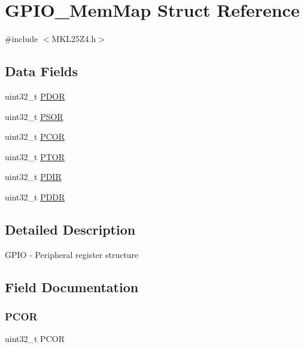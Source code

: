 \hypertarget{struct_g_p_i_o___mem_map}{}\section{G\+P\+I\+O\+\_\+\+Mem\+Map Struct Reference}
\label{struct_g_p_i_o___mem_map}


{\ttfamily \#include $<$M\+K\+L25\+Z4.\+h$>$}

\subsection*{Data Fields}
\begin{DoxyCompactItemize}
\item 
uint32\+\_\+t \hyperlink{struct_g_p_i_o___mem_map_a6d8857d2ca1928bcedd1a83e93946aef}{P\+D\+OR}
\item 
uint32\+\_\+t \hyperlink{struct_g_p_i_o___mem_map_a2fc5ff57bdc9e1de4233930468cbf5e3}{P\+S\+OR}
\item 
uint32\+\_\+t \hyperlink{struct_g_p_i_o___mem_map_adba03f40e10aed5fc14d7ee0698aa6f2}{P\+C\+OR}
\item 
uint32\+\_\+t \hyperlink{struct_g_p_i_o___mem_map_a2a8b6ad3b774b37fcdf9a0f04f56e43b}{P\+T\+OR}
\item 
uint32\+\_\+t \hyperlink{struct_g_p_i_o___mem_map_a4c83a78320344c89b1663969a7c5d749}{P\+D\+IR}
\item 
uint32\+\_\+t \hyperlink{struct_g_p_i_o___mem_map_a37eee18eef001998403709bf78f4a33d}{P\+D\+DR}
\end{DoxyCompactItemize}


\subsection{Detailed Description}
G\+P\+IO -\/ Peripheral register structure 

\subsection{Field Documentation}
\mbox{\label{struct_g_p_i_o___mem_map_adba03f40e10aed5fc14d7ee0698aa6f2}} 
\subsubsection{\texorpdfstring{P\+C\+OR}{PCOR}}
{\footnotesize\ttfamily uint32\+\_\+t P\+C\+OR}

